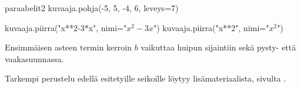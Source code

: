 \begin{luoKuva}{paraabelit2}
	kuvaaja.pohja(-5, 5, -4, 6, leveys=7)
	
	kuvaaja.piirra("x**2-3*x", nimi="$x^2-3x$")
	kuvaaja.piirra("x**2", nimi="$x^2$")
\end{luoKuva}


%	

\begin{center}
\end{center}

Ensimmäisen asteen termin kerroin $b$ vaikuttaa huipun sijaintiin sekä pysty- että vaakasuunnassa.

\begin{center}
\end{center}

Tarkempi perustelu edellä esitetyille seikoille löytyy lisämateriaalista,
sivulta \pageref{paraabeli_tod}.



%
%	
%

